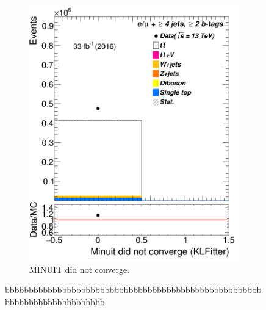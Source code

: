 \begin{figure}
\begin{subfigure}{0.35\textwidth}
		\includegraphics[width=\linewidth]{ControlPlots_emujets_2016_4incl_2incl/klf_minuitDidNotConverge_emujets_2016.png}
		\caption{\textsc{MINUIT} did not converge.} \label{fig:444}
	\end{subfigure}
	
	
	\caption{bbbbbbbbbbbbbbbbbbbbbbbbbbbbbbbbbbbbbbbbbbbbbbbbbbbbbbbbbbbbbbbbbbbbbbbbbbb}
\end{figure}	








